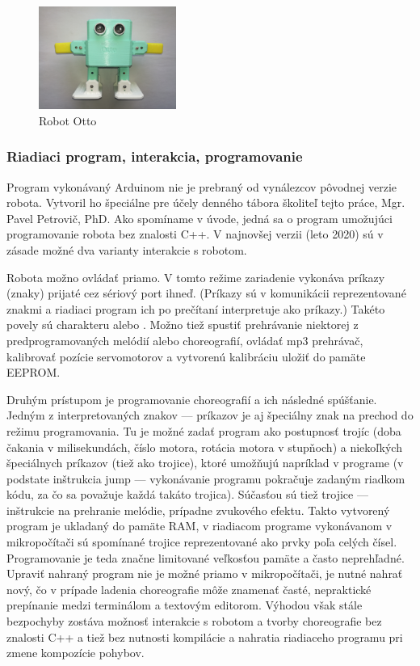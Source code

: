 \begin{figure}
\centerline{\includegraphics[width=0.4\textwidth]{images/otto}}
\caption[Robot Otto]{Robot Otto}
\label{obr:otto}
\end{figure}

\subsubsection{Riadiaci program, interakcia, programovanie}
\label{subsub:otto-programovanie}
Program vykonávaný Arduinom nie je prebraný od vynálezcov pôvodnej verzie robota. Vytvoril ho špeciálne pre účely denného tábora školiteľ tejto práce, Mgr. Pavel Petrovič, PhD. Ako spomíname v úvode, jedná sa o program umožujúci programovanie robota bez znalosti C++. V najnovšej verzii (leto 2020) sú v zásade možné dva varianty interakcie s robotom.

Robota možno ovládať priamo. V tomto režime zariadenie vykonáva príkazy (znaky) prijaté cez sériový port ihneď. (Príkazy sú v komunikácii reprezentované znakmi a riadiaci program ich po prečítaní interpretuje ako príkazy.) Takéto povely sú charakteru  alebo . Možno tiež spustiť prehrávanie niektorej z predprogramovaných melódií alebo choreografií, ovládať mp3 prehrávač, kalibrovať pozície servomotorov a vytvorenú kalibráciu uložiť do pamäte EEPROM.

Druhým prístupom je programovanie choreografií a ich následné spúšťanie. Jedným z interpretovaných znakov --- príkazov je aj špeciálny znak na prechod do režimu programovania. Tu je možné zadať program ako postupnosť trojíc (doba čakania v milisekundách, číslo motora, rotácia motora v stupňoch) a niekoľkých špeciálnych príkazov (tiež ako trojice), ktoré umožňujú napríklad  v programe (v podstate inštrukcia jump --- vykonávanie programu pokračuje zadaným riadkom kódu, za čo sa považuje každá takáto trojica). Súčasťou sú tiež trojice --- inštrukcie na prehranie melódie, prípadne zvukového efektu. Takto vytvorený program je ukladaný do pamäte RAM, v riadiacom programe vykonávanom v mikropočítači sú spomínané trojice reprezentované ako prvky poľa celých čísel. Programovanie je teda značne limitované veľkosťou pamäte a často neprehľadné. Upraviť nahraný program nie je možné priamo v mikropočítači, je nutné nahrať nový, čo v prípade ladenia choreografie môže znamenať časté, nepraktické prepínanie medzi terminálom a textovým editorom. Výhodou však stále bezpochyby zostáva možnosť interakcie s robotom a tvorby choreografie bez znalosti C++ a tiež bez nutnosti kompilácie a nahratia riadiaceho programu pri zmene kompozície pohybov.

